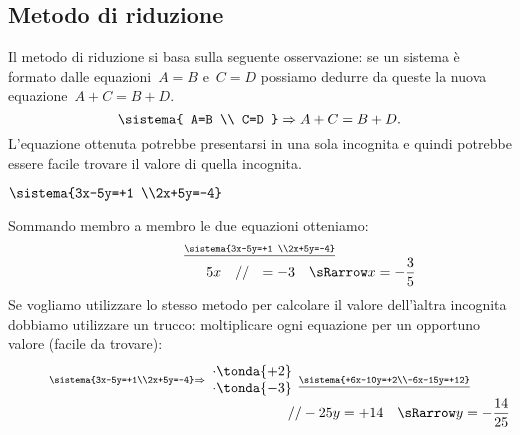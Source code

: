 \subsection{Metodo di riduzione}
Il metodo di riduzione si basa sulla seguente osservazione: se un
sistema è formato dalle equazioni~\(A=B\) e~\(C=D\) possiamo dedurre
da queste la nuova equazione~\(A+C=B+D\).
\begin{equation*}
\sistema{
A=B \\
C=D
}\Rightarrow A+C=B+D.
\end{equation*}
L'equazione ottenuta potrebbe presentarsi in una sola
incognita e quindi potrebbe essere facile trovare il valore di quella
incognita.

 \begin{esempio}
\(\sistema{3x-5y=+1 \\2x+5y=-4}\)

Sommando membro a membro le due equazioni otteniamo:
\[\stackrel{\underline{\sistema{3x-5y=+1 \\2x+5y=-4}}}
  {\qquad \qquad \qquad ~~~~5x ~~~ // ~~ =-3 \quad \sRarrow x=-\frac{3}{5}}\]
Se vogliamo utilizzare lo stesso metodo per calcolare il valore dell'ìaltra 
incognita dobbiamo utilizzare un trucco: moltiplicare ogni equazione per un 
opportuno valore (facile da trovare):
\[\stackrel{\sistema{3x-5y=+1\\2x+5y=-4}\Rightarrow
  \begin{array}{l}\cdot \tonda{+2}\\ \cdot \tonda{-3}\end{array}
  \underline{\sistema{+6x-10y=+2\\-6x-15y=+12}}}
  {\qquad \qquad \qquad \qquad \qquad \qquad \qquad \qquad \qquad \qquad 
   //  -25y  =+14 \quad \sRarrow y=-\frac{14}{25}}\]
 \end{esempio}

